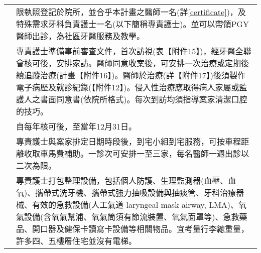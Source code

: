 \begin{longtable}{p{1.3in}p{4.8in}}

\color{OliveGreen}{人力須求}
 & 限執照登記於院所，並合乎本計畫之醫師一名(詳\ref{certificate})，及特殊需求牙科負責護士一名(以下簡稱專責護士)。並可以帶領PGY醫師出診，為社區牙醫服務及教學。\\
 
\color{OliveGreen}{服務內容}
 & 專責護士準備事前審查文件，首次訪視(表【附件15】)，經牙醫全聯會核可後，安排家訪。醫師同意收案後，可安排一次治療或定期後續追蹤治療(計畫【附件16】)。醫師於治療(詳【附件17】)後須製作電子病歷及就診紀錄(【附件12】)。侵入性治療應取得病人家屬或監護人之書面同意書(依院所格式)。每次到訪均須指導案家清潔口腔的技巧。\\

\color{OliveGreen}{計畫期程}
& 自每年核可後，至當年12月31日。\\
 
\color{OliveGreen}{服務場所}
& 專責護士與案家排定日期時段後，到宅小組到宅服務，可按車程距離收取車馬費補助。一診次可安排一至三家，每名醫師一週出診以二次為限。\\

\color{OliveGreen}{設備須求}
& 專責護士打包整理設備，包括個人防護、生理監測器(血壓、血氧)、攜帶式洗牙機、攜帶式強力抽吸設備與抽痰管、牙科治療器械、有效的急救設備(人工氣道 laryngeal mask airway, LMA)、氧氣設備(含氧氣幫浦、氧氣筒須有節流裝置、氧氣面罩等)、急救藥品、開口器及健保卡讀寫卡設備等相關物品。宜考量行李總重量，許多四、五樓層住宅並沒有電梯。\\


\end{longtable}
